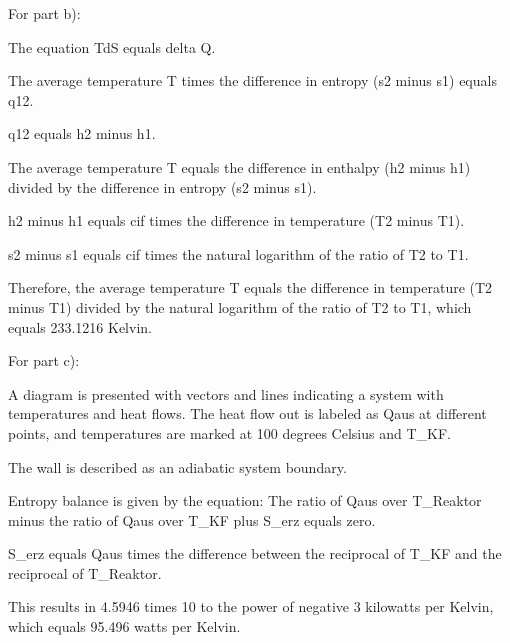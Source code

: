 For part b):

The equation TdS equals delta Q.

The average temperature T times the difference in entropy (s2 minus s1) equals q12.

q12 equals h2 minus h1.

The average temperature T equals the difference in enthalpy (h2 minus h1) divided by the difference in entropy (s2 minus s1).

h2 minus h1 equals cif times the difference in temperature (T2 minus T1).

s2 minus s1 equals cif times the natural logarithm of the ratio of T2 to T1.

Therefore, the average temperature T equals the difference in temperature (T2 minus T1) divided by the natural logarithm of the ratio of T2 to T1, which equals 233.1216 Kelvin.

For part c):

A diagram is presented with vectors and lines indicating a system with temperatures and heat flows. The heat flow out is labeled as Qaus at different points, and temperatures are marked at 100 degrees Celsius and T_KF.

The wall is described as an adiabatic system boundary.

Entropy balance is given by the equation:
The ratio of Qaus over T_Reaktor minus the ratio of Qaus over T_KF plus S_erz equals zero.

S_erz equals Qaus times the difference between the reciprocal of T_KF and the reciprocal of T_Reaktor.

This results in 4.5946 times 10 to the power of negative 3 kilowatts per Kelvin, which equals 95.496 watts per Kelvin.